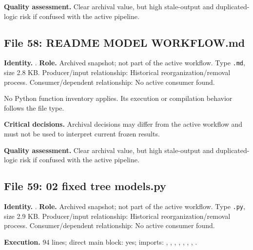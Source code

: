 \documentclass[
  11pt,
  a4paper]{article}
\begin{document}
\textbf{Quality assessment.} Clear archival value, but high stale-output
and duplicated-logic risk if confused with the active pipeline.

\subsection{File 58: README MODEL
WORKFLOW.md}\label{file-4795050084974510755}

\textbf{Identity.}
.
\textbf{Role.} Archived snapshot; not part of the active workflow. Type
\texttt{.md}, size 2.8 KB. Producer/input relationship: Historical
reorganization/removal process. Consumer/dependent relationship: No
active consumer found.

No Python function inventory applies. Its execution or compilation
behavior follows the file type.

\textbf{Critical decisions.} Archival decisions may differ from the
active workflow and must not be used to interpret current frozen
results.

\textbf{Quality assessment.} Clear archival value, but high stale-output
and duplicated-logic risk if confused with the active pipeline.

\subsection{File 59: 02 fixed tree
models.py}\label{file-1072345193112908698}

\textbf{Identity.}
.
\textbf{Role.} Archived snapshot; not part of the active workflow. Type
\texttt{.py}, size 2.9 KB. Producer/input relationship: Historical
reorganization/removal process. Consumer/dependent relationship: No
active consumer found.

\textbf{Execution.} 94 lines; direct main block: yes; imports:
, ,
,
,
,
,
, .
\end{document}
